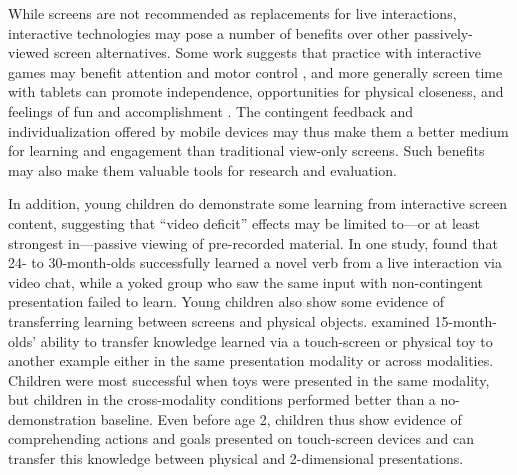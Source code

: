 \documentclass[man,noapacite]{apa2}
\begin{document}
While screens are not recommended as replacements for live interactions, interactive technologies may pose a number of benefits over other passively-viewed screen alternatives. Some work suggests that practice with interactive games may benefit attention and motor control \cite{bavelier2010}, and more generally screen time with tablets can promote independence, opportunities for physical closeness, and feelings of fun and accomplishment . The contingent feedback and individualization offered by mobile devices may thus make them a better medium for learning and engagement than traditional view-only screens. Such benefits may also make them valuable tools for research and evaluation.

In addition, young children do demonstrate some learning from interactive screen content, suggesting that ``video deficit'' effects may be limited to---or at least strongest in---passive viewing of pre-recorded material. In one study,  found that 24- to 30-month-olds successfully learned a novel verb from a live interaction via video chat, while a yoked group who saw the same input with non-contingent presentation failed to learn.
Young children also show some evidence of transferring learning between screens and physical objects.  examined 15-month-olds' ability to transfer knowledge learned via a touch-screen or physical toy to another example either in the same presentation modality or across modalities. Children were most successful when toys were presented in the same modality, but children in the cross-modality conditions performed better than a no-demonstration baseline. Even before age 2, children thus show evidence of comprehending actions and goals presented on touch-screen devices and can transfer this knowledge between physical and 2-dimensional presentations.
\end{document}
